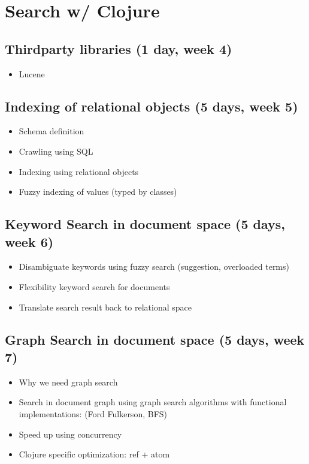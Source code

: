 \documentclass[grad]{uoit-thesis}
\begin{document}
	\chapter{Search w/ Clojure}
		\section{Thirdparty libraries (1 day, week 4)}
			\begin{itemize}
				\item Lucene
			\end{itemize}

		\section{Indexing of relational objects (5 days, week 5)}
			\begin{itemize}
				\item Schema definition
				\item Crawling using SQL
				\item Indexing using relational objects
				\item Fuzzy indexing of values (typed by classes)
			\end{itemize}

		\section{Keyword Search in document space (5 days, week 6)}
			\begin{itemize}
				\item Disambiguate keywords using fuzzy search (suggestion, overloaded terms)
				\item Flexibility keyword search for documents
				\item Translate search result back to relational space
			\end{itemize}

		\section{Graph Search in document space (5 days, week 7)}
			\begin{itemize}
				\item Why we need graph search
				\item Search in document graph using graph search algorithms with functional implementations: (Ford Fulkerson, BFS)
				\item Speed up using concurrency
				\item Clojure specific optimization: ref + atom
			\end{itemize}
\end{document}
